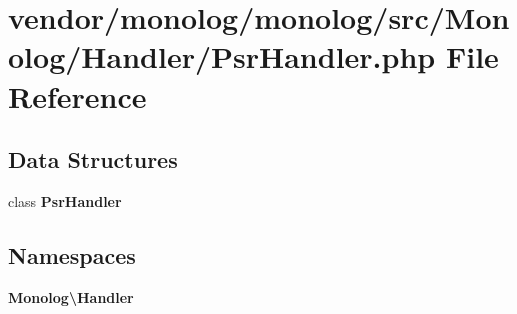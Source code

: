 \section{vendor/monolog/monolog/src/\+Monolog/\+Handler/\+Psr\+Handler.php File Reference}
\label{_psr_handler_8php}
\subsection*{Data Structures}
\begin{DoxyCompactItemize}
\item 
class {\bf Psr\+Handler}
\end{DoxyCompactItemize}
\subsection*{Namespaces}
\begin{DoxyCompactItemize}
\item 
 {\bf Monolog\textbackslash{}\+Handler}
\end{DoxyCompactItemize}

